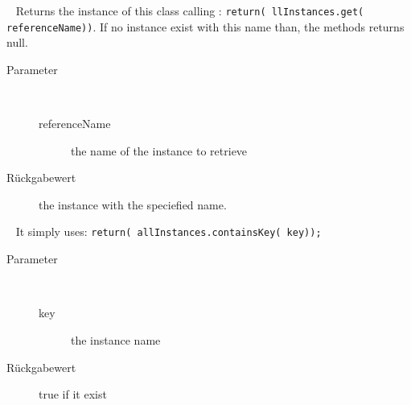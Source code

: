 \begin{description}
~ Returns the instance of this class calling : \verb!return( llInstances.get( referenceName))!.
 If no instance exist with this name than, the methods returns null.
\begin{description}
\item[Parameter] ~
\begin{description}
\item[referenceName]
the name of the instance to retrieve
\end{description}
\item[Rückgabewert] 
the instance with the speciefied name.
\end{description}
\item[{\ltdHypertarget{ontologyFramework.OFRunning.OFInvokingManager.OFBuildedListInvoker.isInAllInstances(java.lang.String)}{isInAllInstances}\label{ontologyFramework.OFRunning.OFInvokingManager.OFBuildedListInvoker.isInAllInstances(java.lang.String)}}]
~ It simply uses: \verb!return( allInstances.containsKey( key));!
\begin{description}
\item[Parameter] ~
\begin{description}
\item[key]
the instance name
\end{description}
\item[Rückgabewert] 
true if it exist
\end{description}
\end{description}
